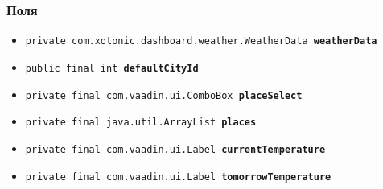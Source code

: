 \documentclass{article}
\begin{document}
{{{{{{{{{{{{{{\subsubsection*{Поля}{
\begin{itemize}
\item{
\label{com.xotonic.dashboard.ui.WeatherUpdater.weatherData}\texttt{private com.xotonic.dashboard.weather.WeatherData\ {\bf  weatherData}}
}
\item{
\label{com.xotonic.dashboard.ui.WeatherUpdater.defaultCityId}\texttt{public final int\ {\bf  defaultCityId}}
}
\item{
\label{com.xotonic.dashboard.ui.WeatherUpdater.placeSelect}\texttt{private final com.vaadin.ui.ComboBox\ {\bf  placeSelect}}
}
\item{
\label{com.xotonic.dashboard.ui.WeatherUpdater.places}\texttt{private final java.util.ArrayList\ {\bf  places}}
}
\item{
\label{com.xotonic.dashboard.ui.WeatherUpdater.currentTemperature}\texttt{private final com.vaadin.ui.Label\ {\bf  currentTemperature}}
}
\item{
\label{com.xotonic.dashboard.ui.WeatherUpdater.tomorrowTemperature}\texttt{private final com.vaadin.ui.Label\ {\bf  tomorrowTemperature}}
}
\end{itemize}}}}}}}}}}}}}}}}
\end{document}
